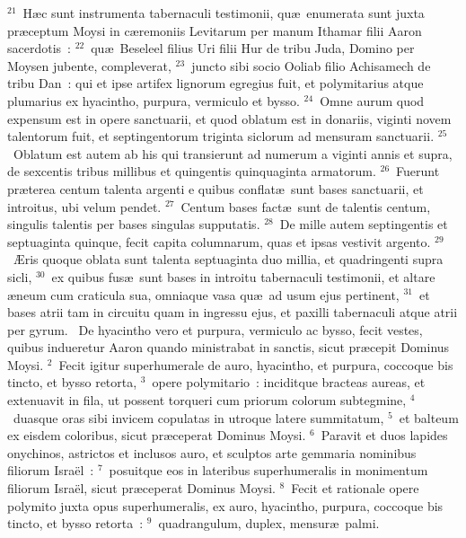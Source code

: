 ${}^{21}$~H\ae c sunt instrumenta tabernaculi testimonii, qu\ae\ enumerata sunt juxta pr\ae ceptum Moysi in c\ae remoniis Levitarum per manum Ithamar filii Aaron sacerdotis~:
${}^{22}$~qu\ae\ Beseleel filius Uri filii Hur de tribu Juda, Domino per Moysen jubente, compleverat,
${}^{23}$~juncto sibi socio Ooliab filio Achisamech de tribu Dan~: qui et ipse artifex lignorum egregius fuit, et polymitarius atque plumarius ex hyacintho, purpura, vermiculo et bysso.
${}^{24}$~Omne aurum quod expensum est in opere sanctuarii, et quod oblatum est in donariis, viginti novem talentorum fuit, et septingentorum triginta siclorum ad mensuram sanctuarii.
${}^{25}$~Oblatum est autem ab his qui transierunt ad numerum a viginti annis et supra, de sexcentis tribus millibus et quingentis quinquaginta armatorum.
${}^{26}$~Fuerunt pr\ae terea centum talenta argenti e quibus conflat\ae\ sunt bases sanctuarii, et introitus, ubi velum pendet.
${}^{27}$~Centum bases fact\ae\ sunt de talentis centum, singulis talentis per bases singulas supputatis.
${}^{28}$~De mille autem septingentis et septuaginta quinque, fecit capita columnarum, quas et ipsas vestivit argento.
${}^{29}$~\AE ris quoque oblata sunt talenta septuaginta duo millia, et quadringenti supra sicli,
${}^{30}$~ex quibus fus\ae\ sunt bases in introitu tabernaculi testimonii, et altare \ae neum cum craticula sua, omniaque vasa qu\ae\ ad usum ejus pertinent,
${}^{31}$~et bases atrii tam in circuitu quam in ingressu ejus, et paxilli tabernaculi atque atrii per gyrum.
~\lettrine[lines=10,image=true,loversize=0.05,lraise=-0.03]{D}{}e hyacintho vero et purpura, vermiculo ac bysso, fecit vestes, quibus indueretur Aaron quando ministrabat in sanctis, sicut pr\ae cepit Dominus Moysi.
${}^{2}$~Fecit igitur superhumerale de auro, hyacintho, et purpura, coccoque bis tincto, et bysso retorta,
${}^{3}$~opere polymitario~: inciditque bracteas aureas, et extenuavit in fila, ut possent torqueri cum priorum colorum subtegmine,
${}^{4}$~duasque oras sibi invicem copulatas in utroque latere summitatum,
${}^{5}$~et balteum ex eisdem coloribus, sicut pr\ae ceperat Dominus Moysi.
${}^{6}$~Paravit et duos lapides onychinos, astrictos et inclusos auro, et sculptos arte gemmaria nominibus filiorum Isra\"el~:
${}^{7}$~posuitque eos in lateribus superhumeralis in monimentum filiorum Isra\"el, sicut pr\ae ceperat Dominus Moysi.
${}^{8}$~Fecit et rationale opere polymito juxta opus superhumeralis, ex auro, hyacintho, purpura, coccoque bis tincto, et bysso retorta~:
${}^{9}$~quadrangulum, duplex, mensur\ae\ palmi.
